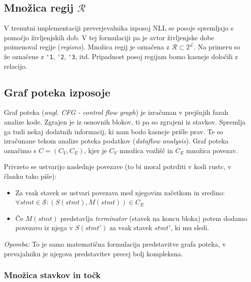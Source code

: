 \documentclass[a4paper,12pt,openright]{book}
\begin{document}
\subsection{Množica regij $\mathcal{R}$}
V trenutni implementaciji preverjevalnika izposoj NLL se posoje spremljajo s pomočjo življenjskih dob.
V tej formulaciji pa je avtor življenjske dobe poimenoval regije (\textit{regions}).
Množica regij je označena z $\mathcal{R} \subset 2^{\mathcal{L}}$.
Na primeru so že označene z \verb|'1|, \verb|'2|, \verb|'3|, itd. Pripadnost posoj regijam bomo kasneje določili z relacijo.

\subsection{Graf poteka izposoje}
Graf poteka (\textit{angl. CFG - control flow graph}) je izračunan v prejšnjih fazah analize kode.
Zgrajen je iz osnovnih blokov, ti pa so zgrajeni iz stavkov. Spremlja ga tudi nekaj dodatnih informacij,
ki nam bodo kasneje prišle prav. Te so izračunane tekom analize poteka podatkov
(\textit{dataflow analysis})\cite{MIRDataflowRust}. Graf poteka označimo s $C = (C_{V}, C_{E})$, kjer
je $C_{V}$ množica vozlišč in $C_{E}$ množica povezav.


Privzeto se ustvarijo naslednje povezave (to bi moral potrditi v kodi rustc, v članku tako piše):

\begin{itemize}
	\item Za vsak stavek se ustvari povezava med njegovim začetkom in sredino:
	      $\forall stmt \in \mathcal{S}: (S(stmt), M(stmt)) \in C_{E}$
	\item Če $M(stmt)$ predstavlja \textit{terminator} (stavek na koncu bloka) potem dodamo povezavo iz njega v $S(stmt')$
	      za vsak stavek $stmt'$, ki mu sledi.
\end{itemize}

\textit{Opomba:} To je samo matematična formulacija predstavitve grafa poteka, v prevajalniku
je njegova predstavitev precej bolj kompleksna.

\subsubsection{Množica stavkov in točk}
\end{document}
